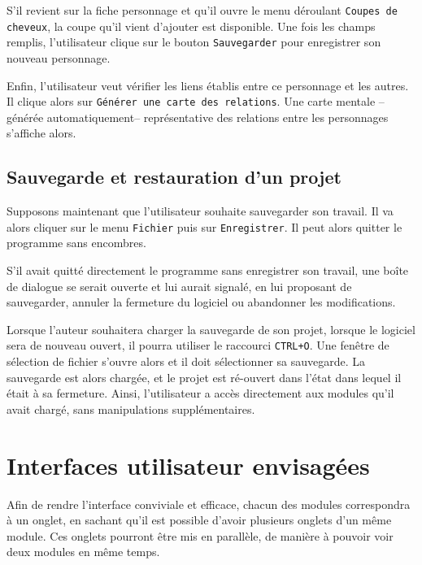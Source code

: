 \documentclass[a4paper,11pt,twoside]{article}
\begin{document}
S'il revient sur la fiche personnage et qu'il ouvre le menu déroulant \texttt{Coupes de cheveux}, la coupe qu'il vient d'ajouter est disponible. Une fois les champs remplis, l'utilisateur clique sur le bouton \texttt{Sauvegarder} pour enregistrer son nouveau personnage.

Enfin, l'utilisateur veut vérifier les liens établis entre ce personnage et les autres. Il clique alors sur \texttt{Générer une carte des relations}. Une carte mentale --générée automatiquement-- représentative des relations entre les personnages s'affiche alors.

\subsection{Sauvegarde et restauration d'un projet}
Supposons maintenant que l'utilisateur souhaite sauvegarder son travail. Il va alors cliquer sur le menu \texttt{Fichier} puis sur \texttt{Enregistrer}. Il peut alors quitter le programme sans encombres.

S'il avait quitté directement le programme sans enregistrer son travail, une boîte de dialogue se serait ouverte et lui aurait signalé, en lui proposant de sauvegarder, annuler la fermeture du logiciel ou abandonner les modifications.

Lorsque l'auteur souhaitera charger la sauvegarde de son projet, lorsque le logiciel sera de nouveau ouvert, il pourra utiliser le raccourci \verb"CTRL+O". Une fenêtre de sélection de fichier s'ouvre alors et il doit sélectionner sa sauvegarde. La sauvegarde est alors chargée, et le projet est ré-ouvert dans l'état dans lequel il était à sa fermeture. Ainsi, l'utilisateur a accès directement aux modules qu'il avait chargé, sans manipulations supplémentaires.


\section{Interfaces utilisateur envisagées}
Afin de rendre l'interface conviviale et efficace, chacun des modules correspondra à un onglet, en sachant qu'il est possible d'avoir plusieurs onglets d'un même module. Ces onglets pourront être mis en parallèle, de manière à pouvoir voir deux modules en même temps.
\end{document}
